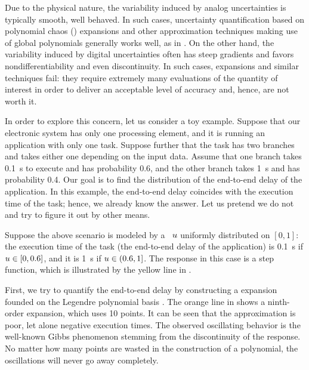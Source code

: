 
Due to the physical nature, the variability induced by analog uncertainties is
typically smooth, well behaved. In such cases, uncertainty quantification based
on polynomial chaos () expansions \cite{xiu2010} and other approximation
techniques making use of global polynomials generally works well, as in
\cite{bhardwaj2008, lee2013, ukhov2014, ukhov2015}. On the other hand, the
variability induced by digital uncertainties often has steep gradients and
favors nondifferentiability and even discontinuity. In such cases, 
expansions and similar techniques fail: they require extremely many evaluations
of the quantity of interest in order to deliver an acceptable level of accuracy
and, hence, are not worth it.

In order to explore this concern, let us consider a toy example. Suppose that
our electronic system has only one processing element, and it is running an
application with only one task. Suppose further that the task has two branches
and takes either one depending on the input data. Assume that one branch takes
0.1~s to execute and has probability 0.6, and the other branch takes 1~s and has
probability 0.4. Our goal is to find the distribution of the end-to-end delay of
the application. In this example, the end-to-end delay coincides with the
execution time of the task; hence, we already know the answer. Let us pretend we
do not and try to figure it out by other means.

Suppose the above scenario is modeled by a \rv\ $u$ uniformly distributed on
$[0, 1]$: the execution time of the task (the end-to-end delay of the
application) is 0.1~s if $u \in [0, 0.6]$, and it is 1~s if $u \in (0.6, 1]$.
The response in this case is a step function, which is illustrated by the yellow
line in .

First, we try to quantify the end-to-end delay by constructing a 
expansion founded on the Legendre polynomial basis \cite{xiu2010}. The orange
line in  shows a ninth-order  expansion, which uses 10
points. It can be seen that the approximation is poor, let alone negative
execution times. The observed oscillating behavior is the well-known Gibbs
phenomenon stemming from the discontinuity of the response. No matter how many
points are wasted in the construction of a polynomial, the oscillations will
never go away completely.

